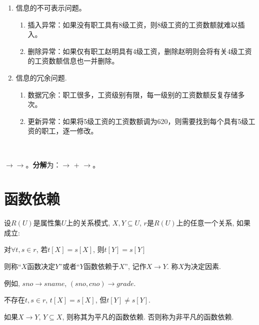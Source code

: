 \begin{enumerate}
    \item 信息的不可表示问题。
    \begin{enumerate}
        \item 插入异常：如果没有职工具有8级工资，则8级工资的工资数额就难以插入。
        \item 删除异常：如果仅有职工赵明具有4级工资，删除赵明则会将有关4级工资的工资数额信息也一并删除。
    \end{enumerate}
    \item 信息的冗余问题.
    \begin{enumerate}
        \item 数据冗余：职工很多，工资级别有限，每一级别的工资数额反复存储多次。
        \item 更新异常：如果将5级工资的工资数额调为620，则需要找到每个具有5级工资的职工，逐一修改。
    \end{enumerate}
\end{enumerate}

\ 

$\to$$\to$。\textbf{分解}为：$\to$ + $\to$。

\section{函数依赖}

\begin{definition}[函数依赖] \label{def:func-dep}
  设$R(U)$是属性集$U$上的关系模式, $X,Y\subseteq U$, $r$是$R(U)$上的任意一个关系, 如果成立:
  \begin{center}
    对$\forall t,s\in r$, 若$t[X]=s[X]$, 则$t[Y]=s[Y]$
  \end{center}
  则称``$X$函数决定$Y$''或者``$Y$函数依赖于$X$'', 记作$X\to Y$. 称$X$为决定因素.
\end{definition}

例如, $sno\to sname$, $(sno, cno)\to grade$.

\begin{definition}[函数依赖的双重否定形式的定义] \label{def:func-dep-2}
  不存在$t,s\in r$, $t[X]=s[X]$, 但$t[Y]\neq s[Y]$.
\end{definition}

\begin{definition}[平凡的函数依赖] \label{def:pingfan-func-dep}
  如果$X\to Y$, $Y\subseteq X$, 则称其为平凡的函数依赖. 否则称为非平凡的函数依赖.
\end{definition}


